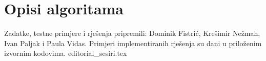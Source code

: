 \documentclass[a4paper]{article}
\date{June 18th 2022}
\begin{document}
\section*{Opisi algoritama}
Zadatke, testne primjere i rješenja pripremili: Dominik Fistrić, Krešimir
Nežmah, Ivan Paljak i Paula Vidas.  Primjeri implementiranih rješenja su dani
u priloženim izvornim kodovima.
\clearpage
\clearpage
{editorial_sesiri.tex}
\end{document}
